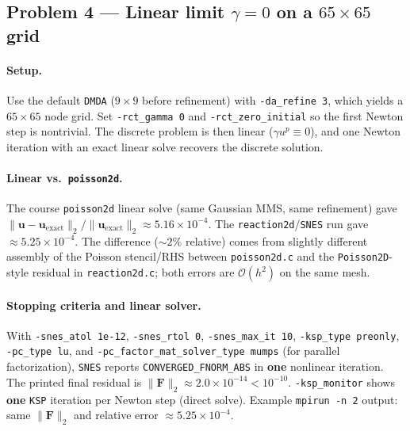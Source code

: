\documentclass[11pt]{article}
\begin{document}
\subsection*{Problem 4 --- Linear limit $\gamma=0$ on a $65\times 65$ grid}

\paragraph{Setup.}
Use the default \texttt{DMDA} ($9\times 9$ before refinement) with \texttt{-da\_refine~3}, which yields a $65\times 65$ node grid. Set \texttt{-rct\_gamma~0} and \texttt{-rct\_zero\_initial} so the first Newton step is nontrivial. The discrete problem is then linear ($\gamma u^p\equiv 0$), and one Newton iteration with an exact linear solve recovers the discrete solution.

\paragraph{Linear vs.\ \texttt{poisson2d}.}
The course \texttt{poisson2d} linear solve (same Gaussian MMS, same refinement) gave $\|\mathbf{u}-\mathbf{u}_{\mathrm{exact}}\|_2/\|\mathbf{u}_{\mathrm{exact}}\|_2 \approx 5.16\times 10^{-4}$. The \texttt{reaction2d}/\texttt{SNES} run gave $\approx 5.25\times 10^{-4}$. The difference ($\sim 2\%$ relative) comes from slightly different assembly of the Poisson stencil/RHS between \texttt{poisson2d.c} and the \texttt{Poisson2D}-style residual in \texttt{reaction2d.c}; both errors are $\mathcal{O}(h^2)$ on the same mesh.

\paragraph{Stopping criteria and linear solver.}
With \texttt{-snes\_atol~1e-12}, \texttt{-snes\_rtol~0}, \texttt{-snes\_max\_it~10}, \texttt{-ksp\_type~preonly}, \texttt{-pc\_type~lu}, and \texttt{-pc\_factor\_mat\_solver\_type~mumps} (for parallel factorization), \texttt{SNES} reports \texttt{CONVERGED\_FNORM\_ABS} in \textbf{one} nonlinear iteration. The printed final residual is $\|\mathbf{F}\|_2 \approx 2.0\times 10^{-14} < 10^{-10}$. \texttt{-ksp\_monitor} shows \textbf{one} \texttt{KSP} iteration per Newton step (direct solve). Example \texttt{mpirun -n~2} output: same $\|\mathbf{F}\|_2$ and relative error $\approx 5.25\times 10^{-4}$.
\end{document}
